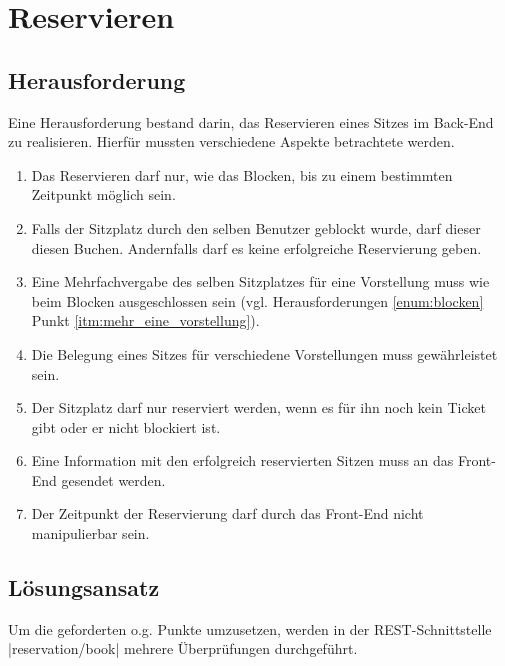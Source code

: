 \section{Reservieren}
\label{sec:reservieren}
\authorsection{\authorSG}

\subsection{Herausforderung}
\label{ssec:herausforderung_reservieren}
\authorsection{\authorSG}
Eine Herausforderung bestand darin, das Reservieren eines Sitzes im Back-End zu realisieren. Hierfür mussten verschiedene Aspekte betrachtete werden.

\begin{enumerate}
	\label{enum:reservieren}
	\item \label{itm:zeitpunkt_reservieren}Das Reservieren darf nur, wie das Blocken, bis zu einem bestimmten Zeitpunkt möglich sein.
	\item \label{itm:geblockt_durch_benutzer} Falls der Sitzplatz durch den selben Benutzer geblockt wurde, darf dieser diesen Buchen. Andernfalls darf es keine erfolgreiche Reservierung geben.
	\item \label{itm:mehr_eine_vorstellung_reservieren}Eine Mehrfachvergabe des selben Sitzplatzes für eine Vorstellung muss wie beim Blocken ausgeschlossen sein (vgl. Herausforderungen \vref{enum:blocken} Punkt \ref{itm:mehr_eine_vorstellung}).
	\item \label{itm:mehr_mehrere_vorstellungen_reservieren}Die Belegung eines Sitzes für verschiedene Vorstellungen muss gewährleistet sein.
	\item \label{itm:ticket_reservieren} Der Sitzplatz darf nur reserviert werden, wenn es für ihn noch kein Ticket gibt oder er nicht blockiert ist.
	\item \label{itm:front_end_reservieren} Eine Information mit den erfolgreich reservierten Sitzen muss an das Front-End gesendet werden.
	\item \label{itm:zeit_reservieren} Der Zeitpunkt der Reservierung darf durch das Front-End nicht manipulierbar sein. 
\end{enumerate}

\subsection{Lösungsansatz}
\label{ssec:loesung_reservieren}
\authorsection{\authorSG}
Um die geforderten o.g. Punkte umzusetzen, werden in der \acs{REST}-Schnittstelle \jinline  |reservation/book| mehrere Überprüfungen durchgeführt.

